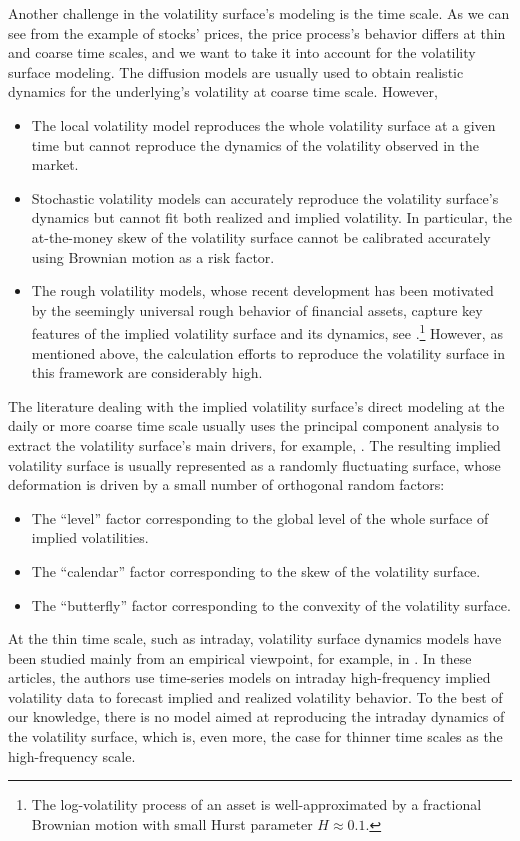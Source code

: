 \documentclass[12pt]{article}
\begin{document}
\medskip
Another challenge in the volatility surface's modeling is the time scale. As we can see from the example of stocks' prices, the price process's behavior differs at thin and coarse time scales, and we want to take it into account for the volatility surface modeling. The diffusion models are usually used to obtain realistic dynamics for the underlying's volatility at coarse time scale. However, 
\begin{itemize}
\item The local volatility model reproduces the whole volatility surface at a given time but cannot reproduce the dynamics of the volatility observed in the market. 
\item Stochastic volatility models can accurately reproduce the volatility surface's dynamics but cannot fit both realized and implied volatility. In particular, the at-the-money skew of the volatility surface cannot be calibrated accurately using Brownian motion as a risk factor.
\item The rough volatility models, whose recent development has been motivated by the seemingly universal rough behavior of financial assets, capture key features of the implied volatility surface and its dynamics, see \cite{bayer2016pricing, el2019roughening, gatheral2018volatility}.\footnote{The log-volatility process of an asset is well-approximated by a fractional Brownian motion with small Hurst parameter $H\approx 0.1$.} However, as mentioned above, the calculation efforts to reproduce the volatility surface in this framework are considerably high.
\end{itemize}
The literature dealing with the implied volatility surface's direct modeling at the daily or more coarse time scale usually uses the principal component analysis to extract the volatility surface's main drivers, for example, \cite{cont2002dynamics, fengler2007semiparametric, kamal2010implied, skiadopoulos2000dynamics}. The resulting implied volatility surface is usually represented as a randomly fluctuating surface, whose deformation is driven by a small number of orthogonal random factors:
\vspace{-2mm}
\begin{itemize}
    \item The ``level'' factor corresponding to the global level of the whole surface of implied volatilities.
    \item The ``calendar'' factor corresponding to the skew of the volatility surface.
    \item The ``butterfly'' factor corresponding to the convexity of the volatility surface.
\end{itemize}
At the thin time scale, such as intraday, volatility surface dynamics models have been studied mainly from an empirical viewpoint, for example, in \cite{dunis2013forecasting, koopman2005forecasting, lee2019impacts, mayhew1995implied, wang2016information}. In these articles, the authors use time-series models on intraday high-frequency implied volatility data to forecast implied and realized volatility behavior. To the best of our knowledge, there is no model aimed at reproducing the intraday dynamics of the volatility surface, which is, even more, the case for thinner time scales as the high-frequency scale. \medskip
\end{document}
